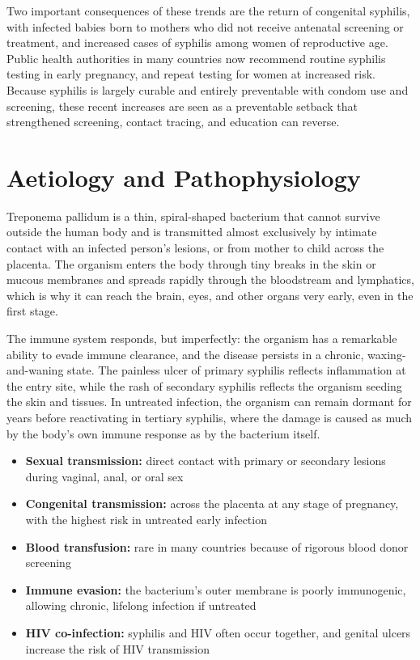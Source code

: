 Two important consequences of these trends are the return of congenital syphilis, with infected babies born to mothers who did not receive antenatal screening or treatment, and increased cases of syphilis among women of reproductive age. Public health authorities in many countries now recommend routine syphilis testing in early pregnancy, and repeat testing for women at increased risk. Because syphilis is largely curable and entirely preventable with condom use and screening, these recent increases are seen as a preventable setback that strengthened screening, contact tracing, and education can reverse.

\section*{Aetiology and Pathophysiology}
Treponema pallidum is a thin, spiral-shaped bacterium that cannot survive outside the human body and is transmitted almost exclusively by intimate contact with an infected person's lesions, or from mother to child across the placenta. The organism enters the body through tiny breaks in the skin or mucous membranes and spreads rapidly through the bloodstream and lymphatics, which is why it can reach the brain, eyes, and other organs very early, even in the first stage.

The immune system responds, but imperfectly: the organism has a remarkable ability to evade immune clearance, and the disease persists in a chronic, waxing-and-waning state. The painless ulcer of primary syphilis reflects inflammation at the entry site, while the rash of secondary syphilis reflects the organism seeding the skin and tissues. In untreated infection, the organism can remain dormant for years before reactivating in tertiary syphilis, where the damage is caused as much by the body's own immune response as by the bacterium itself.

\begin{itemize}
    \item \textbf{Sexual transmission:} direct contact with primary or secondary lesions during vaginal, anal, or oral sex
    \item \textbf{Congenital transmission:} across the placenta at any stage of pregnancy, with the highest risk in untreated early infection
    \item \textbf{Blood transfusion:} rare in many countries because of rigorous blood donor screening
    \item \textbf{Immune evasion:} the bacterium's outer membrane is poorly immunogenic, allowing chronic, lifelong infection if untreated
    \item \textbf{HIV co-infection:} syphilis and HIV often occur together, and genital ulcers increase the risk of HIV transmission
\end{itemize}

